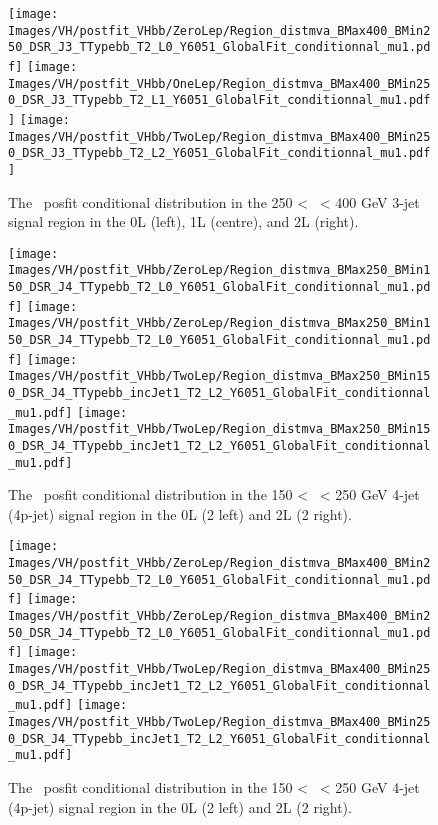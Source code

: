   \begin{figure}[h!]
    \centering
    \texttt{[image: Images/VH/postfit\_VHbb/ZeroLep/Region\_distmva\_BMax400\_BMin250\_DSR\_J3\_TTypebb\_T2\_L0\_Y6051\_GlobalFit\_conditionnal\_mu1.pdf]}
    \texttt{[image:  Images/VH/postfit\_VHbb/OneLep/Region\_distmva\_BMax400\_BMin250\_DSR\_J3\_TTypebb\_T2\_L1\_Y6051\_GlobalFit\_conditionnal\_mu1.pdf]}
    \texttt{[image:  Images/VH/postfit\_VHbb/TwoLep/Region\_distmva\_BMax400\_BMin250\_DSR\_J3\_TTypebb\_T2\_L2\_Y6051\_GlobalFit\_conditionnal\_mu1.pdf]}
    \caption{The \vhb\ posfit conditional distribution in the 250 < \ptv\ < 400 GeV 3-jet signal region in the 0L (left), 1L (centre), and 2L (right).}
    \label{fig:plotsVHBSR_250pt_3J}
  \end{figure} 
  
  \begin{figure}[h!]
    \centering
    \texttt{[image: Images/VH/postfit\_VHbb/ZeroLep/Region\_distmva\_BMax250\_BMin150\_DSR\_J4\_TTypebb\_T2\_L0\_Y6051\_GlobalFit\_conditionnal\_mu1.pdf]}
    \texttt{[image: Images/VH/postfit\_VHbb/ZeroLep/Region\_distmva\_BMax250\_BMin150\_DSR\_J4\_TTypebb\_T2\_L0\_Y6051\_GlobalFit\_conditionnal\_mu1.pdf]}
    \texttt{[image:  Images/VH/postfit\_VHbb/TwoLep/Region\_distmva\_BMax250\_BMin150\_DSR\_J4\_TTypebb\_incJet1\_T2\_L2\_Y6051\_GlobalFit\_conditionnal\_mu1.pdf]}
    \texttt{[image:  Images/VH/postfit\_VHbb/TwoLep/Region\_distmva\_BMax250\_BMin150\_DSR\_J4\_TTypebb\_incJet1\_T2\_L2\_Y6051\_GlobalFit\_conditionnal\_mu1.pdf]}
    \caption{The \vhb\ posfit conditional distribution in the 150 < \ptv\ < 250 GeV 4-jet (4p-jet) signal region in the 0L (2 left) and 2L (2 right).}
    \label{fig:plotsVHBSR_150pt_4J}
  \end{figure} 
  
  \begin{figure}[h!]
    \centering
    \texttt{[image: Images/VH/postfit\_VHbb/ZeroLep/Region\_distmva\_BMax400\_BMin250\_DSR\_J4\_TTypebb\_T2\_L0\_Y6051\_GlobalFit\_conditionnal\_mu1.pdf]}
    \texttt{[image: Images/VH/postfit\_VHbb/ZeroLep/Region\_distmva\_BMax400\_BMin250\_DSR\_J4\_TTypebb\_T2\_L0\_Y6051\_GlobalFit\_conditionnal\_mu1.pdf]}
    \texttt{[image:  Images/VH/postfit\_VHbb/TwoLep/Region\_distmva\_BMax400\_BMin250\_DSR\_J4\_TTypebb\_incJet1\_T2\_L2\_Y6051\_GlobalFit\_conditionnal\_mu1.pdf]}
    \texttt{[image:  Images/VH/postfit\_VHbb/TwoLep/Region\_distmva\_BMax400\_BMin250\_DSR\_J4\_TTypebb\_incJet1\_T2\_L2\_Y6051\_GlobalFit\_conditionnal\_mu1.pdf]}
    \caption{The \vhb\ posfit conditional distribution in the 150 < \ptv\ < 250 GeV 4-jet (4p-jet) signal region in the 0L (2 left) and 2L (2 right).}
    \label{fig:plotsVHBSR_250pt_4J}
  \end{figure} 
  
